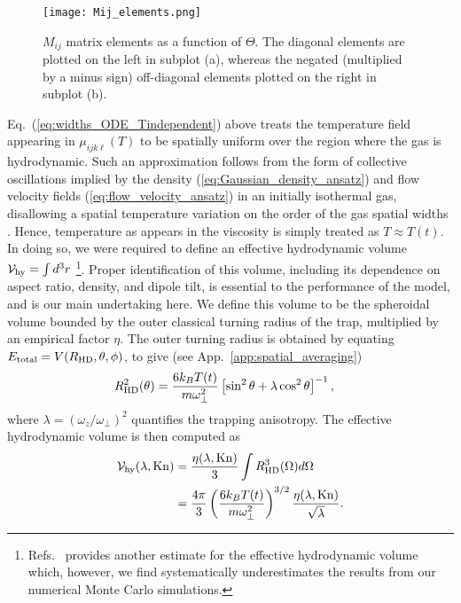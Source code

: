\documentclass[reprint, amsmath, amssymb, aps, superscriptaddress]{revtex4-1}
\begin{document}
\begin{figure}[ht]
    \centering
    \texttt{[image: Mij\_elements.png]}
    \caption{ $M_{i j}$ matrix elements as a function of $\Theta$. The diagonal elements are plotted on the left in subplot (a), whereas the negated (multiplied by a minus sign) off-diagonal elements plotted on the right in subplot (b). }
    \label{fig:Mij_elements}
\end{figure}

Eq.~(\ref{eq:widths_ODE_Tindependent}) above treats the temperature field appearing in $\mu_{i j k \ell}(T)$ to be spatially uniform over the region where the gas is hydrodynamic. Such an approximation follows from the form of collective oscillations implied by the density (\ref{eq:Gaussian_density_ansatz}) and flow velocity fields (\ref{eq:flow_velocity_ansatz}) in an initially isothermal gas, disallowing a spatial temperature variation on the order of the gas spatial widths \cite{Kavoulakis98_PRA, Schafer14_PRA}. Hence, temperature as appears in the viscosity is simply treated as $T \approx T(t)$. 
In doing so, we were required to define an effective hydrodynamic volume ${\cal V}_{\rm hy} = \int d^3 r$ 
\footnote{Refs.~\cite{Kavoulakis98_PRA, Schafer07_PRA} provides another estimate for the effective hydrodynamic volume which, however, we find systematically underestimates the results from our numerical Monte Carlo simulations. }. 
Proper identification of this volume, including its dependence on aspect ratio, density, and dipole tilt, is essential to the performance of the model, and is our main undertaking here.  We define this volume to be the spheroidal volume bounded by the outer classical turning radius of the trap, multiplied by an empirical factor $\eta$. 
The outer turning radius is obtained by equating $E_{\rm total} = V( R_{\rm HD}, \theta, \phi )$, to give (see App.~\ref{app:spatial_averaging})
\begin{align}
    R_{\rm HD}^2( \theta )
    &=
    \frac{ 6 k_B T(t) }{ m \omega_{\perp}^2 }
    \left[ \sin^2\theta + \lambda \cos^2\theta \right]^{-1},
\end{align}
where $\lambda = (\omega_z / \omega_{\perp})^2$ quantifies the trapping anisotropy. 
The effective hydrodynamic volume is then computed as 
\begin{align} \label{eq:HD_volume}
    {\cal V}_{\rm hy}( \lambda, {\rm Kn} )
    &= 
    \frac{ \eta( \lambda, {\rm Kn} ) }{ 3 } 
    \int R_{\rm HD}^3( \Omega ) d\Omega \nonumber\\
    &=
    \frac{ 4 \pi }{ 3 }
    \left(
    \frac{ 6 k_B T(t) }{ m \omega_{\perp}^2 }
    \right)^{3/2}
    \frac{ \eta( \lambda, {\rm Kn} ) }{ \sqrt{ \lambda } }.
\end{align}
\end{document}
